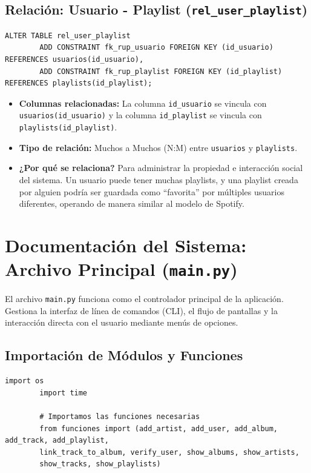 \documentclass[11pt]{article}
\begin{document}
	\vspace{0.5cm}
	
	\subsection{Relación: Usuario - Playlist (\texttt{rel\_user\_playlist})}
	\begin{lstlisting}[style=sqlstyle]
		ALTER TABLE rel_user_playlist
		ADD CONSTRAINT fk_rup_usuario FOREIGN KEY (id_usuario) REFERENCES usuarios(id_usuario),
		ADD CONSTRAINT fk_rup_playlist FOREIGN KEY (id_playlist) REFERENCES playlists(id_playlist);
	\end{lstlisting}
	\begin{itemize}[noitemsep,topsep=2pt]
		\item \textbf{Columnas relacionadas:} La columna \texttt{id\_usuario} se vincula con \texttt{usuarios(id\_usuario)} y la columna \texttt{id\_playlist} se vincula con \texttt{playlists(id\_playlist)}.
		\item \textbf{Tipo de relación:} Muchos a Muchos (N:M) entre \texttt{usuarios} y \texttt{playlists}.
		\item \textbf{¿Por qué se relaciona?} Para administrar la propiedad e interacción social del sistema. Un usuario puede tener muchas playlists, y una playlist creada por alguien podría ser guardada como ``favorita'' por múltiples usuarios diferentes, operando de manera similar al modelo de Spotify.
	\end{itemize}
	
	\newpage
	\section{Documentación del Sistema: Archivo Principal (\texttt{main.py})}
	
	El archivo \texttt{main.py} funciona como el controlador principal de la aplicación. Gestiona la interfaz de línea de comandos (CLI), el flujo de pantallas y la interacción directa con el usuario mediante menús de opciones.
	
	\subsection{Importación de Módulos y Funciones}
	\begin{lstlisting}[style=pythonstyle]
		import os
		import time
		
		# Importamos las funciones necesarias
		from funciones import (add_artist, add_user, add_album, add_track, add_playlist, 
		link_track_to_album, verify_user, show_albums, show_artists, 
		show_tracks, show_playlists)
	\end{lstlisting}
	
\end{document}
